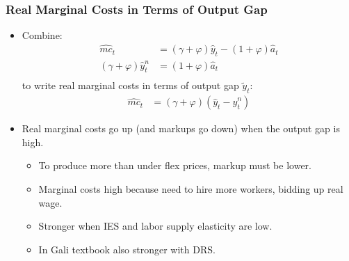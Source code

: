 \documentclass[11pt,aspectratio=169,xcolor={dvipsnames},hyperref={pdftex,pdfpagemode=UseNone,hidelinks,pdfdisplaydoctitle=true},usepdftitle=false]{beamer}
\begin{document}
%
\begin{frame}
\frametitle{Real Marginal Costs in Terms of Output Gap
}
\begin{itemize}
	\item Combine:
	\begin{align*}
		\hat{mc}_t&=(\gamma+\varphi)\hat{y}_t-(1+\varphi)\hat{a}_t \\
		(\gamma+\varphi)\hat{y}_t^{n}&=(1+\varphi)\hat{a}_t \\
\end{align*}
	to write real marginal costs in terms of output gap $\tilde{y}_t$:
	\begin{align*}
		\hat{mc}_t&=(\gamma+\varphi)(\hat{y}_t-\hat{y}_t^{n})
	\end{align*}
	\item Real marginal costs go up (and markups go down) when the output gap is high.
	\begin{itemize}
		\item To produce more than under flex prices, markup must be lower.
		\item Marginal costs high because need to hire more workers,
bidding up real wage.
		\item Stronger when IES and labor supply elasticity are low.
		\item In Gali textbook also stronger with DRS.
	\end{itemize}
\end{itemize}
\end{frame}
\end{document}
